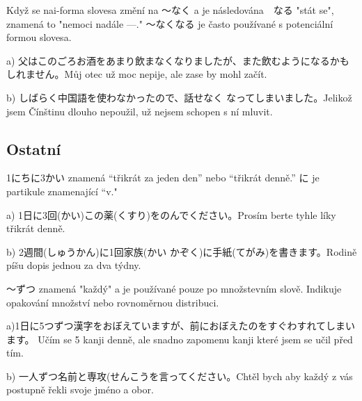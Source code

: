 Když se nai-forma slovesa změní na 〜なく a je následována　なる "stát se", znamená to "nemoci nadále ---." 〜なくなる  je často používané s potenciální formou slovesa. 

a) 父はこのごろお酒をあまり飲まなくなりましたが、また飲むようになるかもしれません。Můj otec už moc nepije, ale zase by mohl začít.



b) しばらく中国語を使わなかったので、話せなく なってしまいました。Jelikož jsem Čínštinu dlouho nepoužil, už nejsem schopen s ní mluvit.


\subsection{ Ostatní}
1にちに3かい znamená  “třikrát za jeden den” nebo “třikrát denně.” に je partikule znamenající  “v."

a) 1日に3回(かい)この薬(くすり)をのんでください。Prosím berte tyhle líky třikrát denně.


b) 2週間(しゅうかん)に1回家族(かい かぞく)に手紙(てがみ)を書きます。Rodině píšu dopis jednou za dva týdny.






 〜ずつ znamená "každý" a je používané pouze po množstevním slově. Indikuje opakování množství nebo rovnoměrnou distribuci.

a)1日に5つずつ漢字をおぼえていますが、前におぼえたのをすぐわすれてしまいます。 Učím se 5 kanji denně, ale snadno zapomenu kanji které jsem se učil před tím.

b) 一人ずつ名前と専攻(せんこうを言ってください。Chtěl bych aby každý z vás postupně řekli svoje jméno a obor.

